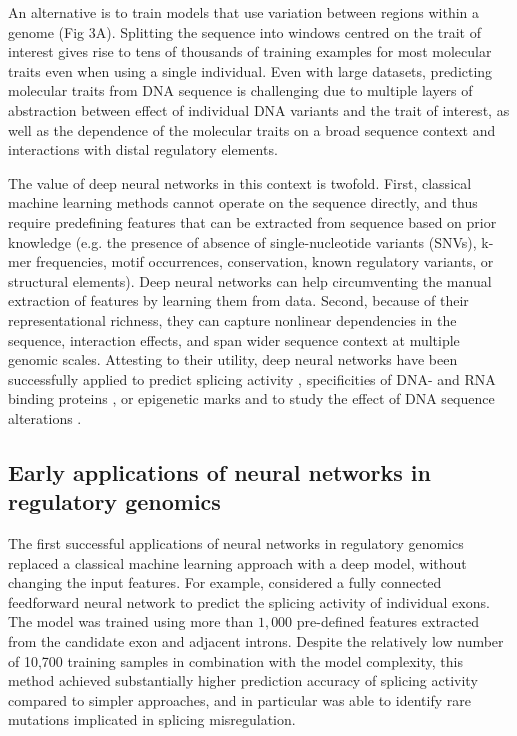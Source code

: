 An alternative is to train models that use variation between regions within a genome (Fig 3A). Splitting the sequence into windows centred on the trait of interest gives rise to tens of thousands of training examples for most molecular traits even when using a single individual. Even with large datasets, predicting molecular traits from DNA sequence is challenging due to multiple layers of abstraction between effect of individual DNA variants and the trait of interest, as well as the dependence of the molecular traits on a broad sequence context and interactions with distal regulatory elements.

The value of deep neural networks in this context is twofold. First, classical machine learning methods cannot operate on the sequence directly, and thus require predefining features that can be extracted from sequence based on prior knowledge (e.g. the presence of absence of single-nucleotide variants (SNVs), k-mer frequencies, motif occurrences, conservation, known regulatory variants, or structural elements). Deep neural networks can help circumventing the manual extraction of features by learning them from data. Second, because of their representational richness, they can capture nonlinear dependencies in the sequence, interaction effects, and span wider sequence context at multiple genomic scales. Attesting to their utility, deep neural networks have been successfully applied to predict splicing activity \citep{leung_deep_2014,xiong_human_2015}, specificities of DNA- and RNA binding proteins \citep{alipanahi_predicting_2015}, or epigenetic marks and to study the effect of DNA sequence alterations \citep{kelley_basset:_2016,zhou_predicting_2015}.

\subsection{Early applications of neural networks in regulatory genomics}
The first successful applications of neural networks in regulatory genomics replaced a classical machine learning approach with a deep model, without changing the input features. For example, \citeauthor{xiong_human_2015} considered a fully connected feedforward neural network to predict the splicing activity of individual exons. The model was trained using more than $1,000$ pre-defined features extracted from the candidate exon and adjacent introns. Despite the relatively low number of 10,700 training samples in combination with the model complexity, this method achieved substantially higher prediction accuracy of splicing activity compared to simpler approaches, and in particular was able to identify rare mutations implicated in splicing misregulation.

